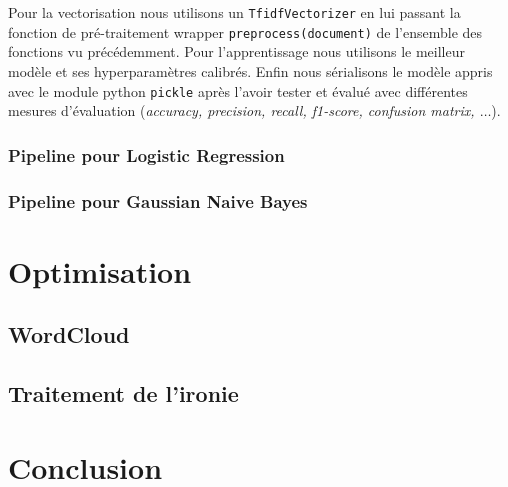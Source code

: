 \documentclass[12pt,a4paper]{report}
\theoremstyle{definition}
\begin{document}
Pour la vectorisation nous utilisons un \texttt{TfidfVectorizer} en lui passant la fonction de pré-traitement wrapper \texttt{preprocess(document)} de l'ensemble des fonctions vu précédemment. Pour l'apprentissage nous utilisons le meilleur modèle et ses hyperparamètres calibrés. Enfin nous sérialisons le modèle appris avec le module python \texttt{pickle} après l'avoir tester et évalué avec différentes mesures d'évaluation (\emph{accuracy,  precision, recall, f1-score, confusion matrix, $\dots$}).

\subsection{Pipeline pour Logistic Regression}

\subsection{Pipeline pour Gaussian Naive Bayes}

\chapter{Optimisation}
\section{WordCloud}
\section{Traitement de l'ironie}

\chapter{Conclusion}
\end{document}
